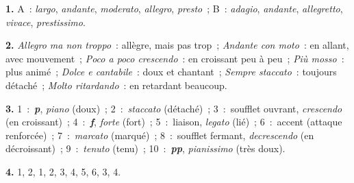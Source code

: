 \textbf{1.} A~: \emph{largo}, \emph{andante}, \emph{moderato}, \emph{allegro}, \emph{presto}~; B~: \emph{adagio}, \emph{andante}, \emph{allegretto}, \emph{vivace}, \emph{prestissimo}.

\textbf{2.} \emph{Allegro ma non troppo}~: allègre, mais pas trop~; \emph{Andante con moto}~: en allant, avec mouvement~; \emph{Poco a poco crescendo}~: en croissant peu à peu~; \emph{Più mosso}~: plus animé~; \emph{Dolce e cantabile}~: doux et chantant~; \emph{Sempre staccato}~: toujours détaché~; \emph{Molto ritardando}~: en retardant beaucoup.

\textbf{3.} 1~:~\textbf{\emph{p}}, \emph{piano} (doux)~; 2~:~\emph{staccato} (détaché)~; 3~:~soufflet ouvrant, \emph{crescendo} (en croissant)~; 4~:~\textbf{\emph{f}}, \emph{forte} (fort)~; 5~:~liaison, \emph{legato} (lié)~; 6~:~accent (attaque renforcée)~; 7~:~\emph{marcato} (marqué)~; 8~:~soufflet fermant, \emph{decrescendo} (en décroissant)~; 9~:~\emph{tenuto} (tenu)~; 10~:~\textbf{\emph{pp}}, \emph{pianissimo} (très doux).

\textbf{4.} 1, 2, 1, 2, 3, 4, 5, 6, 3, 4.
